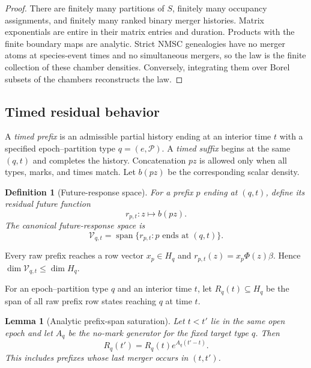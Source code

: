 \documentclass[11pt]{article}
\newtheorem{lemma}[theorem]{Lemma}
\newtheorem{definition}[theorem]{Definition}
\newcommand{\cP}{\mathcal P}
\newcommand{\cV}{\mathcal V}
\begin{document}
\begin{proof}
There are finitely many partitions of $S$, finitely many occupancy assignments, and finitely many ranked binary merger histories.  Matrix exponentials are entire in their matrix entries and duration.  Products with the finite boundary maps are analytic.  Strict NMSC genealogies have no merger atoms at species-event times and no simultaneous mergers, so the law is the finite collection of these chamber densities.  Conversely, integrating them over Borel subsets of the chambers reconstructs the law.
\end{proof}

\subsection{Timed residual behavior}

A \emph{timed prefix} is an admissible partial history ending at an interior time $t$ with a specified epoch--partition type $q=(e,\cP)$.  A \emph{timed suffix} begins at the same $(q,t)$ and completes the history.  Concatenation $pz$ is allowed only when all types, marks, and times match.  Let $b(pz)$ be the corresponding scalar density.

\begin{definition}[Future-response space]
For a prefix $p$ ending at $(q,t)$, define its residual future function
\[
r_{p,t}:z\longmapsto b(pz).
\]
The canonical future-response space is
\[
\cV_{q,t}=\operatorname{span}\{r_{p,t}:p\text{ ends at }(q,t)\}.
\]
\end{definition}

Every raw prefix reaches a row vector $x_p\in H_q$ and $r_{p,t}(z)=x_p\Phi(z)\beta$.  Hence $\dim\cV_{q,t}\le\dim H_q$.

For an epoch--partition type $q$ and an interior time $t$, let $R_q(t)\subseteq H_q$ be the span of all raw prefix row states reaching $q$ at time $t$.

\begin{lemma}[Analytic prefix-span saturation]
\label{lem:prefix-span}
Let $t<t'$ lie in the same open epoch and let $A_q$ be the no-mark generator for the fixed target type $q$.  Then
\[
R_q(t')=R_q(t)e^{A_q(t'-t)}.
\]
This includes prefixes whose last merger occurs in $(t,t')$.
\end{lemma}
\end{document}
